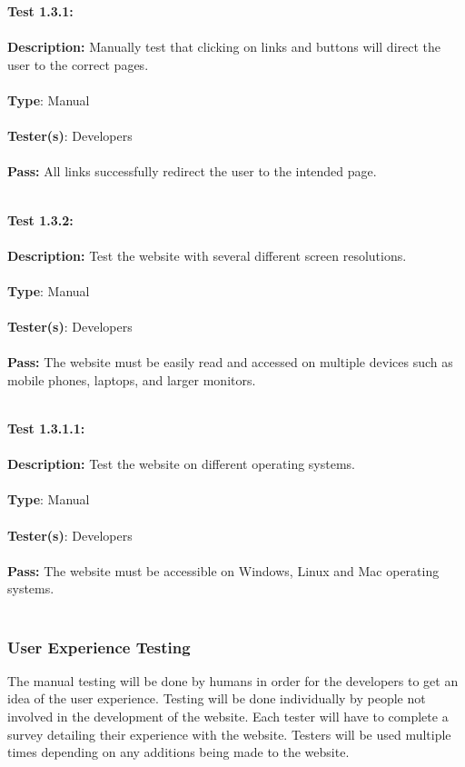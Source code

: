 \documentclass[12pt]{article}
\begin{document}
\begin{tcolorbox}
\textbf{Test 1.3.1:} \\ \\
\textbf{Description:} Manually test that clicking on links and buttons will direct the user to the correct pages. \\ \\
\textbf{Type}: Manual \\ \\
\textbf{Tester(s)}: Developers \\ \\
\textbf{Pass:} All links successfully redirect the user to the intended page. \\ \\
\end{tcolorbox}

\begin{tcolorbox}
\textbf{Test 1.3.2:} \\ \\
\textbf{Description:} Test the website with several different screen resolutions. \\ \\
\textbf{Type}: Manual \\ \\
\textbf{Tester(s)}: Developers \\ \\
\textbf{Pass:} The website must be easily read and accessed on multiple devices such as mobile phones, laptops, and larger monitors. \\ \\
\end{tcolorbox}

\begin{tcolorbox}
\textbf{Test 1.3.1.1:} \\ \\
\textbf{Description:} Test the website on different operating systems. \\ \\
\textbf{Type}: Manual \\ \\
\textbf{Tester(s)}: Developers \\ \\
\textbf{Pass:} The website must be accessible on Windows, Linux and Mac operating systems. \\ \\
\end{tcolorbox}

\subsubsection{User Experience Testing}
The manual testing will be done by humans in order for the developers to get an idea of the user experience. Testing will be done individually by people not involved in the development of the website. Each tester will have to complete a survey detailing their experience with the website. Testers will be used multiple times depending on any additions being made to the website.
\end{document}
